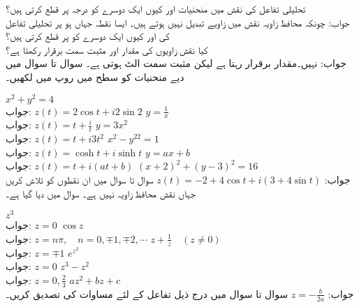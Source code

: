 تحلیلی تفاعل کی نقش میں منحنیات  اور   کیوں ایک دوسرے کو  درجہ پر قطع کرتی ہیں؟\\
جواب:\quad
چونکہ محافظ زاویہ نقش میں زاویے تبدیل نہیں ہوتے ہیں۔
ایسا نقطہ جہاں  ہو پر تحلیلی تفاعل  کی   اور  کیوں ایک دوسرے کو  پر قطع کرتی ہیں؟\\
کیا نقش   زاویوں کی مقدار اور مثبت سمت برقرار رکھتا ہے؟\\
جواب:\quad
نہیں۔مقدار برقرار رہتا ہے لیکن مثبت سمت الٹ ہوتی ہے۔
سوال  تا سوال  میں دیے منحنیات کو  سطح  میں  روپ میں لکھیں۔

\quad
$x^2+y^2=4$\\
جواب:\quad
$z(t)=2\cos t+i2\sin 2$
\quad
$y=\tfrac{1}{x}$\\
جواب:\quad
$z(t)=t+\tfrac{i}{t}$
\quad
$y=3x^2$\\
جواب:\quad
$z(t)=t+i3t^2$
\quad
$x^2-y^22=1$\\
جواب:\quad
$z(t)=\cosh t+i\sinh t$
\quad
$y=ax+b$\\
جواب:\quad
$z(t)=t+i(at+b)$
\quad
$(x+2)^2+(y-3)^2=16$\\
جواب:\quad
$z(t)=-2+4\cos t+i(3+4\sin t)$
سوال  تا سوال  میں ان نقطوں کو تلاش کریں جہاں نقش   محافظ زاویہ نہیں ہے۔ سوال میں دیا گیا ہے۔ 

\quad
$z^3$\\
جواب:\quad
$z=0$
\quad
$\cos z$\\
جواب:\quad
$z=n\pi,\quad n=0,\mp 1,\mp 2,\cdots$
\quad
$z+\tfrac{1}{z}\quad (z\ne 0)$\\
جواب:\quad
$z=\mp 1$
\quad
$e^{z^2}$\\
جواب:\quad
$z=0$
\quad
$z^3-z^2$\\
جواب:\quad
$z=0, \tfrac{2}{3}$
\quad
$az^2+bz+c$\\
جواب:\quad
$z=-\tfrac{b}{2a}$
سوال  تا سوال   میں  درج ذیل تفاعل  کے لئے مساوات  کی تصدیق کریں۔

